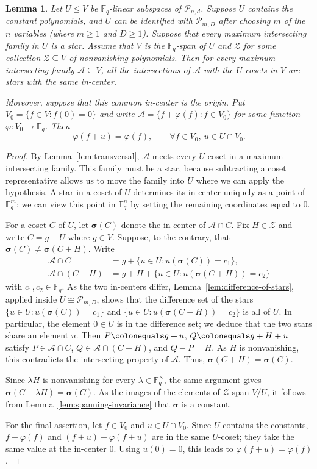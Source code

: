 \documentclass[12pt,reqno]{amsart}
\newtheorem{lem}[thm]{Lemma}
\theoremstyle{definition}
\newcommand{\F}{\mathbb{F}}
\newcommand{\cA}{\mathcal A}
\newcommand{\cP}{\mathcal P}
\begin{document}
\begin{lem}
\label{lem:star-slice-synchronization}
Let $U\leq V$ be $\F_q$-linear subspaces of $\cP_{n,d}$. Suppose $U$ contains the constant polynomials, and $U$ can be identified with $\cP_{m,D}$ after choosing $m$ of the $n$ variables (where $m\geq 1$ and $D\geq 1$). Suppose that every maximum intersecting family in $U$ is a star. Assume that $V$ is the $\F_q$-span of $U$ and $\mathcal{Z}$ for some collection $\mathcal Z\subseteq V$ of nonvanishing polynomials. Then for every maximum intersecting family $\cA\subseteq V$, all the intersections of $\cA$ with the $U$-cosets in $V$ are stars with the same in-center.

Moreover, suppose that this common in-center is the origin. Put
$V_0=\{f\in V:f(0)=0\}$ and write
$\cA=\{f+\varphi(f):f\in V_0\}$ for some function $\varphi\colon V_0\to\F_q$.
Then
\[
\varphi(f+u)=\varphi(f),
\qquad \forall f\in V_0,\ u\in U\cap V_0.
\]
\end{lem}
\begin{proof}
By Lemma~\ref{lem:transversal}, $\cA$ meets every $U$-coset in a maximum intersecting family. This family must be a star, because subtracting a coset representative allows us to move the family into $U$ where we can apply the hypothesis. A star in a coset of $U$ determines its in-center uniquely as a point of $\F_q^m$; we can view this point in $\F_q^n$ by setting the remaining coordinates equal to $0$.

For a coset $C$ of $U$, let $\boldsymbol\sigma(C)$ denote the in-center of
$\mathcal{A}\cap C$. Fix $H\in\mathcal Z$ and write $C=g+U$ where $g\in V$.
Suppose, to the contrary, that $\boldsymbol\sigma(C)\neq \boldsymbol\sigma(C+H)$.
Write 
\begin{align*}
\cA\cap C & =g+\{u\in U:u(\boldsymbol\sigma(C))=c_1\},  \\
\cA\cap(C+H)&=g+H+\{u\in U:u(\boldsymbol\sigma(C+H))=c_2\}
\end{align*}
with $c_1,c_2\in\F_q$. As the two in-centers differ,
Lemma~\ref{lem:difference-of-stars}, applied inside $U\cong\cP_{m,D}$, shows
that the difference set of the stars $\{u\in U:u(\boldsymbol\sigma(C))=c_1\}$ and $\{u\in U:u(\boldsymbol\sigma(C+H))=c_2\}$ is all of $U$. In particular, the element $0\in U$ is in the difference set; we deduce that the two stars share an element $u$. Then $P\colonequals g+u$, $Q \colonequals g+H+u$ satisfy $P\in\cA\cap C$, $Q\in\cA\cap(C+H)$, and $Q-P=H$.
As $H$ is nonvanishing, this contradicts the intersecting property of $\cA$. Thus, $\boldsymbol\sigma(C+H)=\boldsymbol\sigma(C)$.

Since $\lambda H$ is nonvanishing for every $\lambda\in\F_q^\times$,
the same argument gives
$\boldsymbol\sigma(C+\lambda H)=\boldsymbol\sigma(C)$. As the images of the elements of $\mathcal Z$ span $V/U$, it follows from Lemma~\ref{lem:spanning-invariance} that $\boldsymbol\sigma$ is a constant.

For the final assertion, let $f\in V_0$ and $u\in U\cap V_0$.
Since $U$ contains the constants, $f+\varphi(f)$ and $(f+u)+\varphi(f+u)$ are in the same $U$-coset; they take the same value at the in-center $0$. Using $u(0)=0$, this leads to $\varphi(f+u)=\varphi(f)$.
\end{proof}
\end{document}
